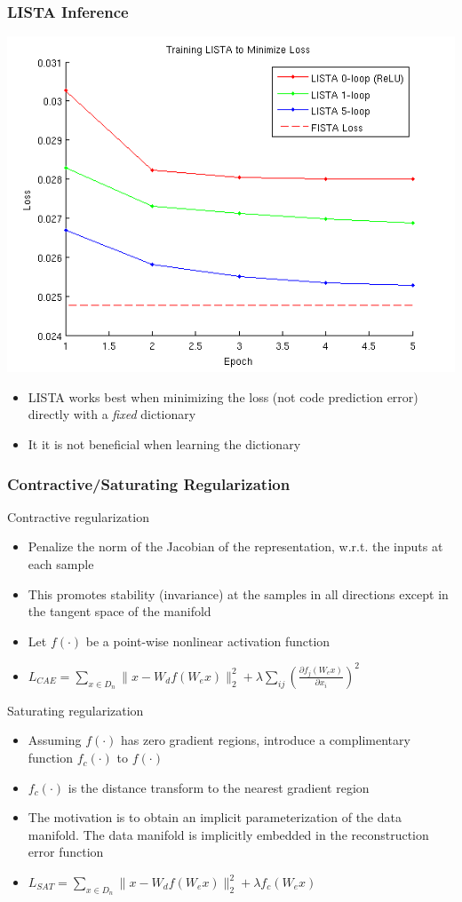 \documentclass{beamer}
\begin{document}
\begin{frame}
\frametitle{LISTA Inference} 
\centerline{\includegraphics[scale=0.35]{./images/LISTA/LISTA_loss_min.png}}
\begin{itemize}
\item LISTA works best when minimizing the loss (not code prediction error) directly with a \emph{fixed} dictionary 
\item It it is not beneficial when learning the dictionary  
\end{itemize} 
\end{frame} 

\begin{frame}
\frametitle{Contractive/Saturating Regularization} 
Contractive regularization
\begin{itemize}
\item Penalize the norm of the Jacobian of the representation, w.r.t. the inputs at each sample
\item This promotes stability (invariance) at the samples in all directions except in the tangent space of the manifold 
\item Let $f(\cdot)$ be a point-wise nonlinear activation function
\item{$L_{CAE} = \sum_{x \in D_n} \|x-W_d f(W_e x)\|_2 ^2 + \lambda \sum_{ij} \left(\frac{\partial f_j(W_e x)}{\partial x_i} \right)^2$ }
\end{itemize} 
Saturating regularization
\begin{itemize}
\item Assuming $f(\cdot)$ has zero gradient regions, introduce a complimentary function $f_c(\cdot)$ to $f(\cdot)$ 
\item $f_c(\cdot)$ is the distance transform to the nearest gradient region 
\item The motivation is to obtain an implicit parameterization of the data manifold. The data manifold is implicitly embedded in the reconstruction error function
\item{$L_{SAT} = \sum_{x \in D_n} \|x-W_d f(W_e x)\|_2 ^2 + \lambda f_c(W_e x)$ }
\end{itemize} 
\end{frame} 
\end{document}
